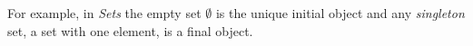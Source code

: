 \begin{frame}
\noindent For example, in \textit{Sets} the empty set $\emptyset$ is the unique
initial object and any {\it singleton} set, a set with one element,
is a final object.
\end{frame}